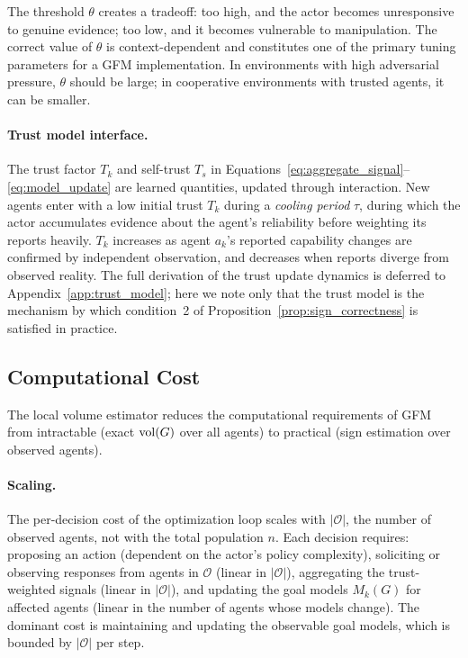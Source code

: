 The threshold $\theta$ creates a tradeoff: too high, and the actor becomes
unresponsive to genuine evidence; too low, and it becomes vulnerable to
manipulation. The correct value of $\theta$ is context-dependent and
constitutes one of the primary tuning parameters for a GFM implementation. In
environments with high adversarial pressure, $\theta$ should be large; in
cooperative environments with trusted agents, it can be smaller.

\paragraph{Trust model interface.} The trust factor $T_k$ and self-trust $T_s$
in Equations~\eqref{eq:aggregate_signal}--\eqref{eq:model_update} are learned
quantities, updated through interaction. New agents enter with a low initial
trust $T_k$ during a \emph{cooling period} $\tau$, during which the actor
accumulates evidence about the agent's reliability before weighting its reports
heavily. $T_k$ increases as agent $a_k$'s reported capability changes are
confirmed by independent observation, and decreases when reports diverge from
observed reality. The full derivation of the trust update dynamics is deferred
to Appendix~\ref{app:trust_model}; here we note only that the trust model is
the mechanism by which condition~2 of Proposition~\ref{prop:sign_correctness}
is satisfied in practice.


\subsection{Computational Cost}
\label{subsec:computational_cost}

The local volume estimator reduces the computational requirements of GFM from
intractable (exact $\operatorname{vol}(G)$ over all agents) to practical (sign estimation
over observed agents).

\paragraph{Scaling.} The per-decision cost of the optimization loop scales with
$|\mathcal{O}|$, the number of observed agents, not with the total population
$n$. Each decision requires: proposing an action (dependent on the actor's
policy complexity), soliciting or observing responses from agents in
$\mathcal{O}$ (linear in $|\mathcal{O}|$), aggregating the trust-weighted
signals (linear in $|\mathcal{O}|$), and updating the goal models $M_k(G)$ for
affected agents (linear in the number of agents whose models change). The
dominant cost is maintaining and updating the observable goal models, which is
bounded by $|\mathcal{O}|$ per step.


